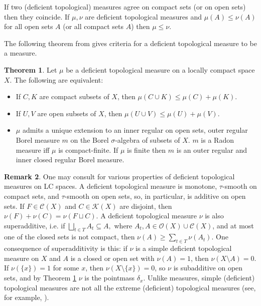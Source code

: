 \documentclass[sn-mathphys-num]{sn-jnl}%
\theoremstyle{thmstyleone}%
\theoremstyle{definition}
\newtheorem{theorem}{Theorem}%
\newtheorem{remark}[theorem]{Remark}
\begin{document}
\noindent
If two (deficient topological) measures agree on compact sets (or on open sets) then they coincide. If $\mu, \nu$ are deficient topological measures
and $\mu(A) \le \nu(A)$ for all open sets $A$ (or all compact sets $A$) then $ \mu \le \nu$.

The following theorem from \cite[Sect. 4]{Butler:DTMLC} gives criteria for a deficient topological measure to be a measure.

\begin{theorem} \label{subaddit}
Let $\mu$ be a deficient topological measure on a locally compact space $X$. 
The following are equivalent: 
\begin{itemize}
\item[(a)]
If $C, K$ are compact subsets of $X$, then $\mu(C \cup K ) \le \mu(C) + \mu(K)$.
\item[(b)]
If $U, V$ are open subsets of $X$,  then $\mu(U \cup V) \le \mu(U) + \mu(V)$.
\item[(c)]
$\mu$ admits a unique extension to an inner regular on open sets, outer regular Borel measure 
$m$ on the Borel $\sigma$-algebra of subsets of $X$. 
$m$ is a Radon measure iff $\mu$ is compact-finite. 
If $\mu$ is finite then $m$ is an outer regular and inner closed regular Borel measure.
\end{itemize}
\end{theorem}

\begin{remark} \label{tausm}
One may consult  \cite{Butler:DTMLC} for various properties of deficient topological measures on LC spaces.
A deficient topological measure is monotone, $\tau$-smooth on compact sets, and $\tau$-smooth on open sets, 
so, in particular, is additive on open sets.
If $ F \in \mathscr{C}(X)$ and $C \in \mathscr{K}(X)$ are disjoint, then $ \nu(F) + \nu(C) = \nu ( F \sqcup C)$.
A deficient topological measure $ \nu$ is also superadditive, i.e. 
if $ \bigsqcup_{t \in T} A_t \subseteq A, $  where $A_t, A \in \mathscr{O}(X) \cup \mathscr{C}(X)$,  
and at most one of the closed sets is not compact, then 
$\nu(A) \ge \sum_{t \in T } \nu(A_t)$. 
One consequence of superadditivity is this:
if $ \nu$ is a simple deficient topological measure on $X$ and $A$ is a closed or open set with $ \nu(A) =1$, then $ \nu(X \setminus A) = 0$.
If $ \nu(\{x\}) = 1$ for some $x$, then $ \nu(X \setminus \{x \}) = 0$, so $\nu$ is subadditive on open sets,  
and by Theorem \ref{subaddit} $\nu$ is the pointmass $ \delta_x$.
Unlike measures, simple (deficient) topological measures are not all the extreme (deficient) topological measures  
(see, for example, \cite{QfunctionsEtm}).
\end{remark}
\end{document}
